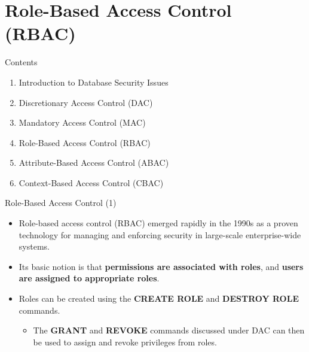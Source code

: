 \section{Role-Based Access Control (RBAC)}

\begin{frame}{Contents}
    \Large
    \begin{enumerate}
        \color{gray}
        \item Introduction to Database Security Issues
        \item Discretionary Access Control (DAC)
        \item Mandatory Access Control (MAC)
        
        \color{black} \bfseries
        \item Role-Based Access Control (RBAC)
        \item Attribute-Based Access Control (ABAC)
        
        \color{gray} \mdseries
          \item Context-Based Access Control (CBAC)
    \end{enumerate}
\end{frame}


\begin{frame}{Role-Based Access Control (1)}
    \Large
    \begin{itemize}
        \item Role-based access control (RBAC) emerged rapidly in the 1990s as a proven technology for managing and enforcing security in large-scale enterprise-wide systems.
        
        \vspace{0.3cm}
        \item Its basic notion is that \textbf{permissions are associated with roles}, and \textbf{users are assigned to appropriate roles}.
        
        \item Roles can be created using the \textbf{CREATE ROLE} and \textbf{DESTROY ROLE} commands.
        
        \begin{itemize}
            \large \item The \textbf{GRANT} and \textbf{REVOKE} commands discussed under DAC can then be used to assign and revoke privileges from roles.
    \end{itemize}
\end{itemize}
\end{frame}

